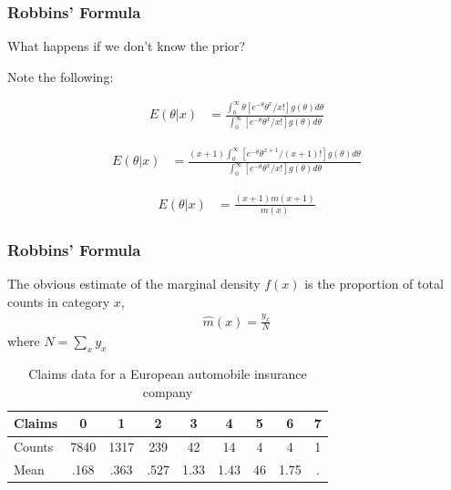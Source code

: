 \documentclass[
  shownotes,
  xcolor={svgnames},
  hyperref={colorlinks,citecolor=DarkBlue,linkcolor=DarkRed,urlcolor=DarkBlue}
  , aspectratio=169]{beamer}
\begin{document}
\begin{frame}[fragile]
\frametitle{Robbins' Formula}
What happens if we don't know the prior? 

Note the following:

\begin{align}
E(\theta|x)&=   \frac{\int_0^{\infty} \theta[e^{-\theta} \theta^x/x!]g(\theta)d\theta}{\int_0^{\infty} [e^{-\theta} \theta^x/x!]g(\theta)d\theta}
\end{align}
\medskip

\begin{align}
E(\theta|x)&=   \frac{(x+1) \int_0^{\infty} [e^{-\theta} \theta^{x+1}/(x+1)!]g(\theta)d\theta}{\int_0^{\infty} [e^{-\theta} \theta^x/x!]g(\theta)d\theta}
\end{align}

\begin{align}
E(\theta|x)&=   \frac{(x+1) m(x+1)}{m(x)} 
\end{align}

\end{frame}


\begin{frame}[fragile]
\frametitle{Robbins' Formula}
The obvious estimate of the marginal density $f(x)$ is the proportion of total counts in category $x$,
\begin{align}
\hat m(x)= \frac{y_x}{N}
\end{align}
where $N=\sum_x y_x$ 

\begin{table}[H]
\caption{Claims data for a European automobile insurance company}
\begin{tabular}{lcccccccc}
Claims & 0    & 1    & 2   & 3  & 4  & 5 & 6 & 7 \\
\hline
Counts & 7840 & 1317 & 239 & 42 & 14 & 4 & 4 & 1 \\
Mean & .168 & .363 & .527 & 1.33 & 1.43 & 46 & 1.75 & . \\
\end{tabular}
\end{table}

\end{frame}

\end{document}
